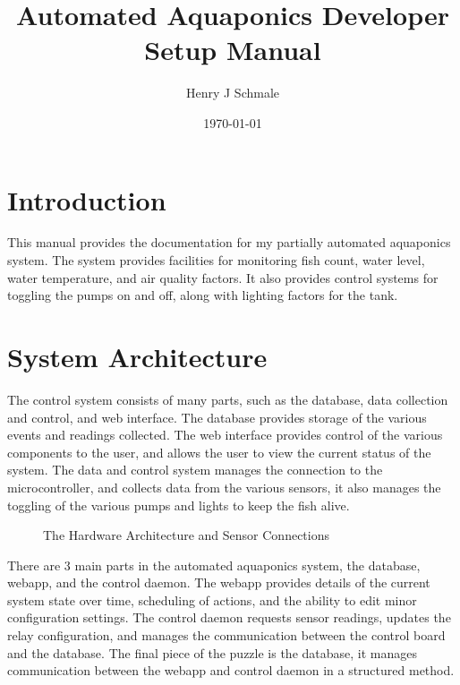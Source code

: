 \documentclass[american,12pt]{article}
\title{Automated Aquaponics Developer Setup Manual}
\author{Henry J Schmale}
\date{\today}
\begin{document}
\maketitle
\tableofcontents

\section{Introduction}
This manual provides the documentation for my partially automated aquaponics
system. The system provides facilities for monitoring fish count, water level,
water temperature, and air quality factors. It also provides control systems
for toggling the pumps on and off, along with lighting factors for the tank.

\section{System Architecture}
The control system consists of many parts, such as the database, data collection
and control, and web interface. The database provides storage of the various
events and readings collected. The web interface provides control of the various
components to the user, and allows the user to view the current status of the system.
The data and control system manages the connection to the microcontroller, and collects
data from the various sensors, it also manages the toggling of the various pumps and
lights to keep the fish alive.

\begin{figure}[h]
    \centering
    \caption{The Hardware Architecture and Sensor Connections}
    \label{fig:Hardware Architecture}
\end{figure}

There are 3 main parts in the automated aquaponics system, the database,
webapp, and the control daemon. The webapp provides details of the current
system state over time, scheduling of actions, and the ability to edit
minor configuration settings. The control daemon requests sensor readings,
updates the relay configuration, and manages the communication between the
control board and the database. The final piece of the puzzle is the
database, it manages communication between the webapp and control daemon in
a structured method.
\end{document}

